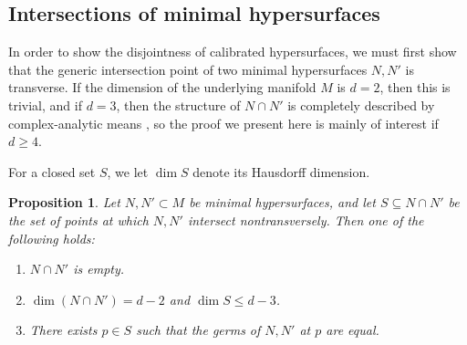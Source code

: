 \documentclass[reqno,11pt]{amsart}
\newcommand{\Sph}{\mathbf S}
\newcommand{\Ball}{\mathbf{B}}
\newtheorem{lemma}[theorem]{Lemma}
\newtheorem{proposition}[theorem]{Proposition}
\theoremstyle{definition}
\numberwithin{equation}{section}
\begin{document}

\subsection{Intersections of minimal hypersurfaces}\label{nodal appendix}
In order to show the disjointness of calibrated hypersurfaces, we must first show that the generic intersection point of two minimal hypersurfaces $N, N'$ is transverse.
If the dimension of the underlying manifold $M$ is $d = 2$, then this is trivial, and if $d = 3$, then the structure of $N \cap N'$ is completely described by complex-analytic means \cite[Theorem 7.3]{colding2011course}, so the proof we present here is mainly of interest if $d \geq 4$.

For a closed set $S$, we let $\dim S$ denote its Hausdorff dimension.

\begin{proposition}\label{intersection theory prop}
Let $N, N' \subset M$ be minimal hypersurfaces, and let $S \subseteq N \cap N'$ be the set of points at which $N, N'$ intersect nontransversely.
Then one of the following holds:
\begin{enumerate}
\item $N \cap N'$ is empty.
\item $\dim(N \cap N') = d - 2$ and $\dim S \leq d - 3$.
\item There exists $p \in S$ such that the germs of $N, N'$ at $p$ are equal.
\end{enumerate}
\end{proposition}
\end{document}
